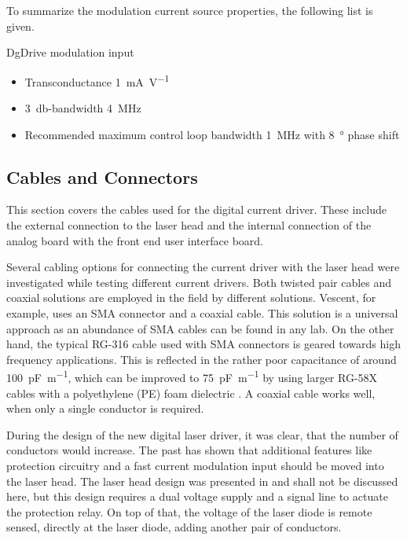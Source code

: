To summarize the modulation current source properties, the following list is given.
\begin{center}
    \begin{deviceProperties}[label={lst:dgDrive_properties_modulation}]{DgDrive modulation input}
    \begin{itemize}
        \item Transconductance \qty{1}{\mA \per \V}
        \item \qty{3}{\decibel}-bandwidth \qty{4}{\MHz}
        \item Recommended maximum control loop bandwidth \qty{1}{\MHz} with \qty{8}{\degree} phase shift
    \end{itemize}
    \end{deviceProperties}
\end{center}

\subsection{Cables and Connectors}
\label{sec:cables_and_connectors}
This section covers the cables used for the digital current driver. These include the external connection to the laser head and the internal connection of the analog board with the front end user interface board.

Several cabling options for connecting the current driver with the laser head were investigated while testing different current drivers. Both twisted pair cables and coaxial solutions are employed in the field by different solutions. Vescent, for example, uses an SMA connector and a coaxial cable. This solution is a universal approach as an abundance of SMA cables can be found in any lab. On the other hand, the typical RG-316 cable used with SMA connectors is geared towards high frequency applications. This is reflected in the rather poor capacitance of around \qty{100}{\pF \per \m}, which can be improved to \qty{75}{\pF \per \m} by using larger RG-58X cables with a polyethylene (PE) foam dielectric \cite{datasheet_7808A}. A coaxial cable works well, when only a single conductor is required.

During the design of the new digital laser driver, it was clear, that the number of conductors would increase. The past has shown that additional features like protection circuitry and a fast current modulation input should be moved into the laser head. The laser head design was presented in \cite{current_mod_paper} and shall not be discussed here, but this design requires a dual voltage supply and a signal line to actuate the protection relay. On top of that, the voltage of the laser diode is remote sensed, directly at the laser diode, adding another pair of conductors.

